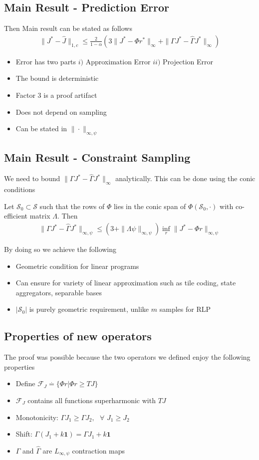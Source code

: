 \documentclass{article}
\renewcommand{\S}{\mathcal{S}}
\newcommand{\eqdef}{\stackrel{\cdot}{=}}
\newcommand{\F}{\mathcal{F}}
\newcommand{\one}{\mathbf{1}}
\newcommand{\mb}{\mbox{ }}
\newcommand{\norm}[1]{\|#1\|}
\newcommand{\hj}{\hat{J}}
\newcommand{\hg}{\hat{\Gamma}}
\begin{document}
\subsection{Main Result - Prediction Error}
Then Main result can be stated as follows
\begin{align*}
\norm{J^*-\hj}_{1,c}\leq \frac{2}{1-\alpha}( 3\norm{J^*-\Phi r^*}_{\infty}+ \norm{\Gamma J^*-\hg J^*}_{\infty})
\end{align*}
\begin{itemize}
\item Error has two parts $i)$ Approximation Error $ii)$ Projection Error
\item The bound is deterministic
\item Factor $3$ is a proof artifact
\item Does not depend on sampling
\item Can be stated in $\norm{\cdot}_{\infty,\psi}$
\end{itemize}


\subsection{Main Result - Constraint Sampling}
We need to bound $\norm{\Gamma J^*-\hg J^*}_{\infty}$ analytically. This can be done using the conic conditions

Let $\S_0\subset \S$ such that the rows of $\Phi$ lies in the conic span of $\Phi(\S_0,\cdot)$ with co-efficient matrix $\Lambda$. Then
\begin{align*}
\norm{ \Gamma J^*-\hg J^* }_{\infty,\psi}\leq (3+\norm{\Lambda \psi}_{\infty,\psi})\inf_r\norm{J^*-\Phi r}_{
\infty,\psi}
\end{align*}

By doing so we achieve the following
\begin{itemize}
\item Geometric condition for linear programs
\item Can ensure for variety of linear approximation such as tile coding, state aggregators, separable bases
\item $|\S_0|$ is purely geometric requirement, unlike $m$ samples for RLP
\end{itemize}


\subsection{Properties of new operators}
The proof was possible because the two operators we defined enjoy the following properties
\begin{itemize}
\item Define $\F_J\eqdef\{\Phi r | \Phi r\geq TJ \}$
\item $\F_J$ contains all functions superharmonic with $TJ$
\item {Monotonicity:} $\Gamma J_1\geq \Gamma J_2, \mb \forall$ $J_1\geq J_2$
\item {Shift:} $\Gamma (J_1+k\one)= \Gamma J_1+ k\one$
\item $\Gamma$ and $\hg$ are $L_{\infty,\psi}$ contraction maps
\end{itemize}
\end{document}
